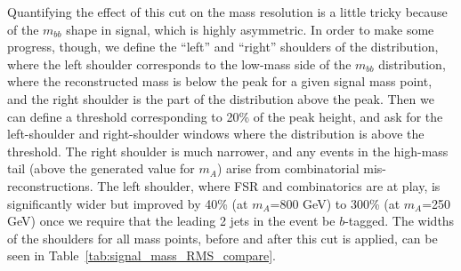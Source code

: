 Quantifying the effect of this cut on the mass resolution is a little tricky because of the
$m_{bb}$ shape in signal, which is highly asymmetric.  In order to make some progress, though,
we define the ``left'' and ``right'' shoulders of the distribution, where the left shoulder
corresponds to the low-mass side of the $m_{bb}$ distribution, where the reconstructed mass 
is below the peak for a given signal mass point,
and the right shoulder is the part of the distribution above the peak.  Then we can define
a threshold corresponding to 20\% of the peak height, and ask for the left-shoulder and right-shoulder
windows where the distribution is above the threshold.  The right shoulder is much narrower,
and any events in the high-mass tail (above the generated value for $m_A$) arise from 
combinatorial mis-reconstructions.  The left shoulder, where FSR and combinatorics are
at play, is significantly wider but improved by 40\% (at $m_A$=800 GeV) to 300\% (at $m_A$=250 GeV)
once we require that the leading 2 jets in the event be $b$-tagged.  The widths of the shoulders
for all mass points, before and after this cut is applied, can be seen in Table~\ref{tab:signal_mass_RMS_compare}.



